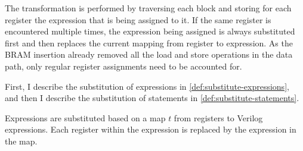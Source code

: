 \newcommand\substmap{t}
\newcommand\substexpr[2]{\texttt{subst\_expr}\ #1\ #2}
\newcommand\subststmnt[2]{\texttt{subst\_stmnt}\ #1\ #2}
\newcommand\invinsubstmap[4]{\texttt{in\_subst\_map}\ #1\ #2\ #3\ #4}
\newcommand\invnotinsubstmap[3]{\texttt{not\_in\_subst\_map}\ #1\ #2\ #3}

The transformation is performed by traversing each block and storing for each
register the expression that is being assigned to it.  If the same register is
encountered multiple times, the expression being assigned is always substituted
first and then replaces the current mapping from register to expression.  As the
BRAM insertion already removed all the load and store operations in the data
path, only regular register assignments need to be accounted for.

First, I describe the substitution of expressions in
\cref{def:substitute-expressions}, and then I describe the substitution of
statements in \cref{def:substitute-statements}.

\begin{definition}%
  \label{def:substitute-expressions}

  Expressions are substituted based on a map $\substmap$ from registers to
  Verilog expressions.  Each register within the expression is replaced by the
  expression in the map.

\end{definition}

